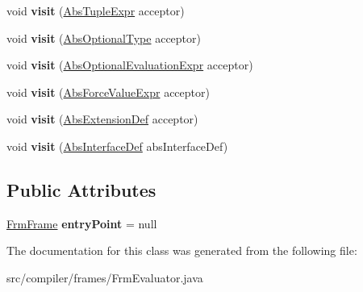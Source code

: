 \begin{DoxyCompactItemize}
void {\bfseries visit} (\hyperlink{classcompiler_1_1abstr_1_1tree_1_1expr_1_1_abs_tuple_expr}{Abs\+Tuple\+Expr} acceptor)
\item 
\mbox{\label{classcompiler_1_1frames_1_1_frm_evaluator_a13cb6a1b25dc40dad9008b3e3229e4f1}} 
void {\bfseries visit} (\hyperlink{classcompiler_1_1abstr_1_1tree_1_1type_1_1_abs_optional_type}{Abs\+Optional\+Type} acceptor)
\item 
\mbox{\label{classcompiler_1_1frames_1_1_frm_evaluator_a4fc3f06cfa16a45630a306122b534fd9}} 
void {\bfseries visit} (\hyperlink{classcompiler_1_1abstr_1_1tree_1_1expr_1_1_abs_optional_evaluation_expr}{Abs\+Optional\+Evaluation\+Expr} acceptor)
\item 
\mbox{\label{classcompiler_1_1frames_1_1_frm_evaluator_a7d296a383f83af39cc0b9d172e71d4d1}} 
void {\bfseries visit} (\hyperlink{classcompiler_1_1abstr_1_1tree_1_1expr_1_1_abs_force_value_expr}{Abs\+Force\+Value\+Expr} acceptor)
\item 
\mbox{\label{classcompiler_1_1frames_1_1_frm_evaluator_a49f2b48692ea1770ba4ec956b3c9ef37}} 
void {\bfseries visit} (\hyperlink{classcompiler_1_1abstr_1_1tree_1_1def_1_1_abs_extension_def}{Abs\+Extension\+Def} acceptor)
\item 
\mbox{\label{classcompiler_1_1frames_1_1_frm_evaluator_a00dfa8f045bf6809fc8b0ffdf8a22c1a}} 
void {\bfseries visit} (\hyperlink{classcompiler_1_1abstr_1_1tree_1_1def_1_1_abs_interface_def}{Abs\+Interface\+Def} abs\+Interface\+Def)
\end{DoxyCompactItemize}
\subsection*{Public Attributes}
\begin{DoxyCompactItemize}
\item 
\mbox{\label{classcompiler_1_1frames_1_1_frm_evaluator_a2e4eaa682a8f333ea620d5a5d4f90837}} 
\hyperlink{classcompiler_1_1frames_1_1_frm_frame}{Frm\+Frame} {\bfseries entry\+Point} = null
\end{DoxyCompactItemize}


The documentation for this class was generated from the following file\+:\begin{DoxyCompactItemize}
\item 
src/compiler/frames/Frm\+Evaluator.\+java\end{DoxyCompactItemize}
